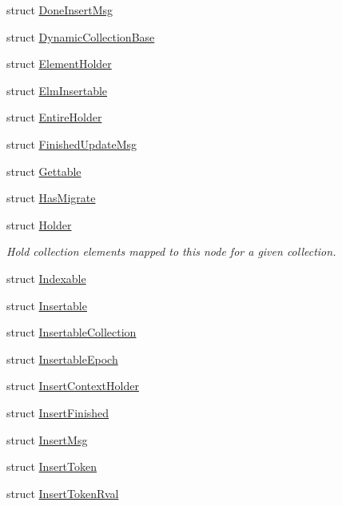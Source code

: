 \begin{DoxyCompactItemize}
\item 
struct \hyperlink{structvt_1_1vrt_1_1collection_1_1_done_insert_msg}{Done\+Insert\+Msg}
\item 
struct \hyperlink{structvt_1_1vrt_1_1collection_1_1_dynamic_collection_base}{Dynamic\+Collection\+Base}
\item 
struct \hyperlink{structvt_1_1vrt_1_1collection_1_1_element_holder}{Element\+Holder}
\item 
struct \hyperlink{structvt_1_1vrt_1_1collection_1_1_elm_insertable}{Elm\+Insertable}
\item 
struct \hyperlink{structvt_1_1vrt_1_1collection_1_1_entire_holder}{Entire\+Holder}
\item 
struct \hyperlink{structvt_1_1vrt_1_1collection_1_1_finished_update_msg}{Finished\+Update\+Msg}
\item 
struct \hyperlink{structvt_1_1vrt_1_1collection_1_1_gettable}{Gettable}
\item 
struct \hyperlink{structvt_1_1vrt_1_1collection_1_1_has_migrate}{Has\+Migrate}
\item 
struct \hyperlink{structvt_1_1vrt_1_1collection_1_1_holder}{Holder}
\begin{DoxyCompactList}\small\item\em Hold collection elements mapped to this node for a given collection. \end{DoxyCompactList}\item 
struct \hyperlink{structvt_1_1vrt_1_1collection_1_1_indexable}{Indexable}
\item 
struct \hyperlink{structvt_1_1vrt_1_1collection_1_1_insertable}{Insertable}
\item 
struct \hyperlink{structvt_1_1vrt_1_1collection_1_1_insertable_collection}{Insertable\+Collection}
\item 
struct \hyperlink{structvt_1_1vrt_1_1collection_1_1_insertable_epoch}{Insertable\+Epoch}
\item 
struct \hyperlink{structvt_1_1vrt_1_1collection_1_1_insert_context_holder}{Insert\+Context\+Holder}
\item 
struct \hyperlink{structvt_1_1vrt_1_1collection_1_1_insert_finished}{Insert\+Finished}
\item 
struct \hyperlink{structvt_1_1vrt_1_1collection_1_1_insert_msg}{Insert\+Msg}
\item 
struct \hyperlink{structvt_1_1vrt_1_1collection_1_1_insert_token}{Insert\+Token}
\item 
struct \hyperlink{structvt_1_1vrt_1_1collection_1_1_insert_token_rval}{Insert\+Token\+Rval}

\end{DoxyCompactItemize}
